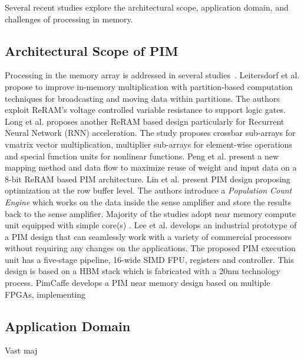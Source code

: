 Several recent studies explore the architectural scope, application domain, and challenges of processing in memory.

\subsection{Architectural Scope of PIM}

Processing in the memory array is addressed in several studies~\cite{03,06,13,15,20,29}. Leitersdorf et al. \cite{13} propose to improve in-memory multiplication with partition-based computation techniques for broadcasting and moving data within partitions. The authors exploit ReRAM's voltage controlled variable resistance to support logic gates. Long et al. \cite{20} proposes another ReRAM based design particularly for Recurrent Neural Network (RNN) acceleration. The study proposes crossbar sub-arrays for vmatrix vector multiplication, multiplier sub-arrays for element-wise operations and special function units for nonlinear functions. Peng et al. \cite{15} present a new mapping method and data flow to maximize reuse of weight and input data on a 8-bit ReRAM based PIM architecture. 
Lin et al. \cite{31} present PIM design proposing optimization at the row buffer level. The authors introduce a \textit{Population Count Engine} which works on the data inside the sense amplifier and store the results back to the sense amplifier. Majority of the studies adopt near memory compute unit equipped with simple core(s) \cite{01,02,05,11,12,17,30,32,33,34,35}. Lee et al. \cite{12} develops an industrial prototype of a PIM design that can seamlessly work with a variety of commercial processors without requiring any changes on the applications. The proposed PIM execution unit has a five-stage pipeline, 16-wide SIMD FPU, registers and controller. This design is based on a HBM stack which is fabricated with a 20nm technology process. PimCaffe \cite{16} develops a PIM near memory design based on multiple FPGAs, implementing       

\subsection{Application Domain}

Vast maj

